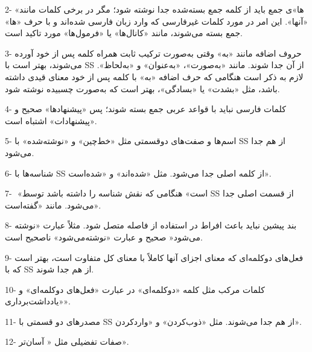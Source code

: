 2-	«ها»ی جمع باید از كلمه جمع بسته‌شده جدا نوشته شود؛ مگر در برخی كلمات مانند «آنها». این امر در مورد كلمات غیر‌فارسی كه وارد زبان فارسی شده‌اند و با حرف «ها» جمع بسته می‌شوند، مانند «كانال‌ها» یا «فرمول‌ها» مورد تاكید است.

3-	حروف اضافه مانند «به» وقتی به‌صورت تركیب ثابت همراه كلمه پس از خود آورده می‌شوند، بهتر است با SS از آن جدا شوند‌.‌ مانند «به‌صورت»، «به‌عنوان» و «به‌‌‌لحاظ»‌.‌ لازم به ذكر است هنگامی كه حرف اضافه «به» با كلمه پس از خود معنای قیدی داشته باشد، مثل «بشدت» یا «بسادگی»، بهتر است كه به‌صورت چسبیده نوشته شود‌.

4-	كلمات فارسی نباید با قواعد عربی جمع بسته شوند؛ پس «پیشنهادها» صحیح و «پیشنهادات» اشتباه است‌.‌

5-	اسم‌ها و صفت‌های دو‌قسمتی مثل «خط‌چین» و «نوشته‌شده» با SS از هم جدا می‌شود‌.‌

6-	شناسه‌ها با SS از كلمه اصلی جدا می‌شود‌.‌ مثل «شده‌اند»‌ و «شده‌است». 

7-	‌ «است» هنگامی كه نقش شناسه را داشته باشد توسط SS از قسمت اصلی جدا می‌شود‌.‌ مانند «گفته‌است»‌.

8-	بند پیشین نباید باعث افراط در استفاده از فاصله متصل شود. مثلاً عبارت «نوشته می‌شود‌« صحیح و عبارت «نوشته‌می‌شود» ناصحیح است. 

9-	فعل‌های دو‌كلمه‌ای كه معنای اجزای آنها كاملاً با معنای كل متفاوت است، بهتر است كه با SS از هم جدا ‌شوند‌.‌

10-	كلمات مركب مثل كلمه «دوكلمه‌ای» در عبارت «فعل‌های دوكلمه‌ای» و «یادداشت‌برداری».

11-	مصدرهای دو قسمتی با SS از هم جدا می‌شوند‌.‌ مثل «ذوب‌كردن» و «واردكردن»‌.

12-	 صفات تفضیلی مثل « آسان‌تر».
